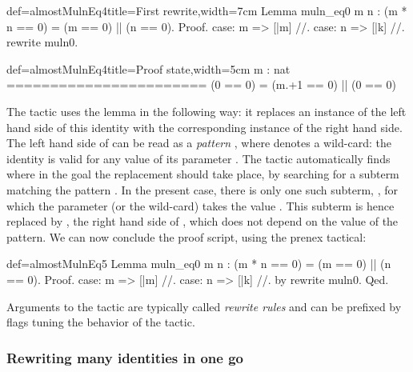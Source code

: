 \begin{coq}{def=almostMulnEq4}{title=First rewrite,width=7cm}
Lemma muln_eq0 m n :
  (m * n == 0) = (m == 0) || (n == 0).
Proof.
case: m => [|m] //.
case: n => [|k] //.
rewrite muln0.
\end{coq}
\begin{coqout}{def=almostMulnEq4}{title=Proof state,width=5cm}
m : nat
=======================
(0 == 0) =
  (m.+1 == 0) || (0 == 0)
\end{coqout}

The  tactic uses the  lemma in the following way:
it replaces an instance of the left hand side of this identity with the
corresponding instance of the right hand side. The left hand side of
 can be read as a \emph{pattern} , where \C{_}
denotes a wild-card: the identity is
valid for any value of its parameter . The tactic
automatically  finds  where in the goal the replacement should take
place, by searching for a subterm matching the pattern .
In the present case, there is only one such subterm,
, for which the parameter (or the wild-card) takes the
value . This subterm is hence replaced by , the right
hand side of , which does not depend on the value of the
pattern. We can now conclude the proof script, using the
prenex  tactical:

\begin{coq}{def=almostMulnEq5}{}
Lemma muln_eq0 m n : (m * n == 0) = (m == 0) || (n == 0).
Proof.
case: m => [|m] //.
case: n => [|k] //.
by rewrite muln0.
Qed.
\end{coq}

Arguments to the  tactic are typically called
\emph{rewrite rules} and can
be prefixed by flags tuning the behavior of the tactic.


\subsubsection{Rewriting many identities in one go}
\label{sec:multirew}


